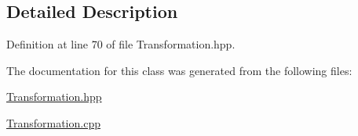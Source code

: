 \subsection{Detailed Description}


Definition at line 70 of file Transformation.\-hpp.



The documentation for this class was generated from the following files\-:\begin{DoxyCompactItemize}
\item 
\hyperlink{_transformation_8hpp}{Transformation.\-hpp}\item 
\hyperlink{_transformation_8cpp}{Transformation.\-cpp}\end{DoxyCompactItemize}
